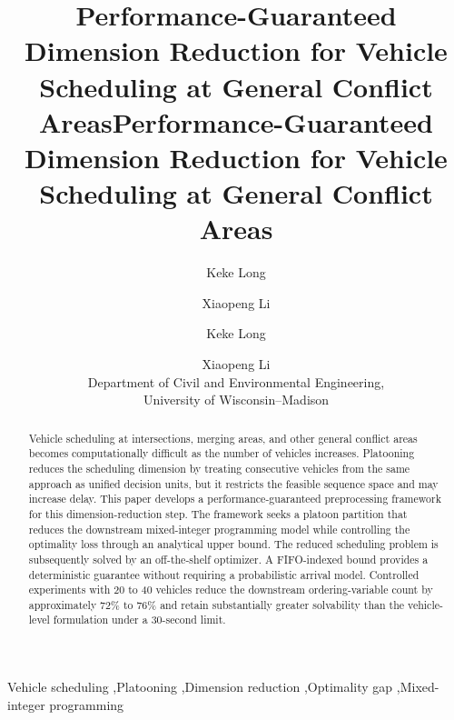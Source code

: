 \documentclass[preprint,12pt]{elsarticle}
\begin{document}
\ifelsevierclass
{}
\begin{frontmatter}

\title{Performance-Guaranteed Dimension Reduction for Vehicle Scheduling at General Conflict Areas}

\author[uw]{Keke Long}
\author[uw]{Xiaopeng Li}

\begin{abstract}
Vehicle scheduling at intersections, merging areas, and other general conflict areas becomes computationally difficult as the number of vehicles increases. Platooning reduces the scheduling dimension by treating consecutive vehicles from the same approach as unified decision units, but it restricts the feasible sequence space and may increase delay. This paper develops a performance-guaranteed preprocessing framework for this dimension-reduction step. The framework seeks a platoon partition that reduces the downstream mixed-integer programming model while controlling the optimality loss through an analytical upper bound. The reduced scheduling problem is subsequently solved by an off-the-shelf optimizer. A FIFO-indexed bound provides a deterministic guarantee without requiring a probabilistic arrival model. Controlled experiments with 20 to 40 vehicles reduce the downstream ordering-variable count by approximately 72\% to 76\% and retain substantially greater solvability than the vehicle-level formulation under a 30-second limit.
\end{abstract}

\begin{keyword}
Vehicle scheduling \sep Platooning \sep Dimension reduction \sep Optimality gap \sep Mixed-integer programming
\end{keyword}

\end{frontmatter}
\else
\title{Performance-Guaranteed Dimension Reduction for Vehicle Scheduling at General Conflict Areas}
\author{Keke Long \and Xiaopeng Li\\
Department of Civil and Environmental Engineering,\\
University of Wisconsin--Madison}
\date{}
\maketitle
\end{document}
